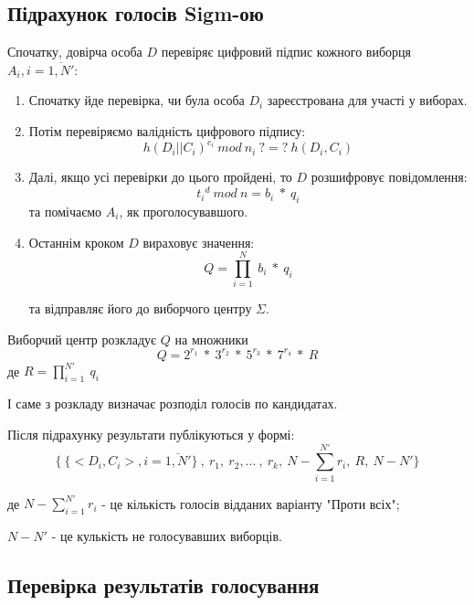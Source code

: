 \subsection{Підрахунок голосів Sigm-ою}

Спочатку, довірча особа $D$ перевіряє цифровий підпис кожного виборця $A_i, i=\overline{1,N'}$:
\begin{enumerate}
    \item Спочатку йде перевірка, чи була особа $D_i$ зареєстрована для участі у виборах.
    \item Потім перевіряємо валідність цифрового підпису: 
    \[h(D_i||C_i)^{e_i}\ mod\ n_i\ ?=?\ h(D_i, C_i) \]
    
    \item Далі, якщо усі перевірки до цього пройдені, то $D$ розшифровує повідомлення:
    \[ {t_i}^d\ mod\ n = b_i\ *\ q_i\]
    та помічаємо $A_i$, як проголосувавшого.

    \item Останнім кроком $D$ вираховує значення:
    \[ Q = \prod_{i=1}^N \ b_i\ *\ q_i\]

    та відправляє його до виборчого центру $\Sigma$.
\end{enumerate}

Виборчий центр розкладує $Q$ на множники 
\[ Q = 2^{r_1}\ *\ 3^{r_2}\ *\ 5^{r_3}\ *\ 7^{r_4}\ *\ R\]
де $R = \prod_{i=1}^{N'}\ q_i$

І саме з розкладу визначає розподіл голосів по кандидатах.

Після підрахунку результати публікуються у формі:
\[ \{\ \{<D_i,C_i>, i=\overline{1,N'}\}\ ,\ r_1,\ r_2, ...\ ,\ r_k,\ N-\sum_{i=1}^{N'}r_i ,\ R,\ N-N' \} \]

де $N-\sum_{i=1}^{N'}r_i$ - це кількість голосів відданих варіанту "Проти всіх";

$N-N'$ - це кулькість не голосувавших виборців.

\subsection{Перевірка результатів голосування}

